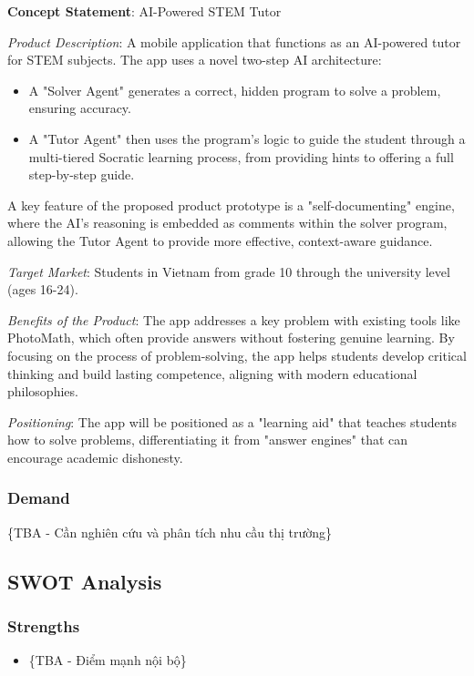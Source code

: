 \begin{mdframed}[linewidth=1pt,linecolor=black,backgroundcolor=white]
\textbf{Concept Statement}: AI-Powered STEM Tutor

\textit{Product Description}: A mobile application that functions as an AI-powered tutor for STEM subjects. The app uses a novel two-step AI architecture:
\begin{itemize}
\item A "Solver Agent" generates a correct, hidden program to solve a problem, ensuring accuracy.
\item A "Tutor Agent" then uses the program's logic to guide the student through a multi-tiered Socratic learning process, from providing hints to offering a full step-by-step guide.
\end{itemize}

A key feature of the proposed product prototype is a "self-documenting" engine, where the AI's reasoning is embedded as comments within the solver program, allowing the Tutor Agent to provide more effective, context-aware guidance.

\textit{Target Market}: Students in Vietnam from grade 10 through the university level (ages 16-24).

\textit{Benefits of the Product}: The app addresses a key problem with existing tools like PhotoMath, which often provide answers without fostering genuine learning. By focusing on the process of problem-solving, the app helps students develop critical thinking and build lasting competence, aligning with modern educational philosophies.

\textit{Positioning}: The app will be positioned as a "learning aid" that teaches students how to solve problems, differentiating it from "answer engines" that can encourage academic dishonesty.
\end{mdframed}

\subsubsection{Demand}
\{TBA - Cần nghiên cứu và phân tích nhu cầu thị trường\}

\subsection{SWOT Analysis}
\subsubsection{Strengths}
\begin{itemize}
    \item \{TBA - Điểm mạnh nội bộ\}
\end{itemize}

